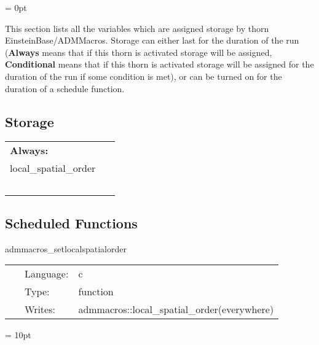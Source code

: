 \parskip = 0pt


\noindent This section lists all the variables which are assigned storage by thorn EinsteinBase/ADMMacros.  Storage can either last for the duration of the run ({\bf Always} means that if this thorn is activated storage will be assigned, {\bf Conditional} means that if this thorn is activated storage will be assigned for the duration of the run if some condition is met), or can be turned on for the duration of a schedule function.


\subsection*{Storage}

\hspace{5mm}

 \begin{tabular*}{160mm}{ll} 

{\bf Always:}&  ~ \\ 
 local\_spatial\_order & ~\\ 
~ & ~\\ 
\end{tabular*} 


\subsection*{Scheduled Functions}
\vspace{5mm}


\hspace{5mm} admmacros\_setlocalspatialorder 

\hspace{5mm}{\it initialize the local\_spatial\_order } 


\hspace{5mm}

 \begin{tabular*}{160mm}{cll} 
~ & Language:  & c \\ 
~ & Type:  & function \\ 
~ & Writes:  & admmacros::local\_spatial\_order(everywhere) \\ 
\end{tabular*} 



\vspace{5mm}\parskip = 10pt 

